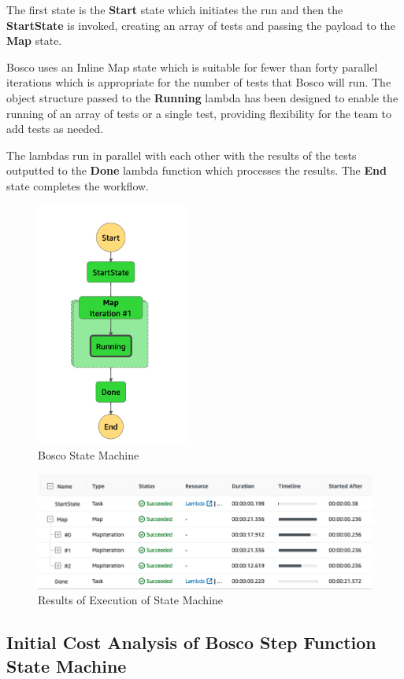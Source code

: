 \documentclass[12pt,a4paper,titlepage]{report}
\begin{document}
The first state is the \textbf{Start} state which initiates the run and then the \textbf{StartState} is invoked, creating an array of tests and passing the payload to the \textbf{Map} state.

Bosco uses an Inline Map state which is suitable for fewer than forty parallel iterations which is appropriate for the number of tests that Bosco will run. 
The object structure passed to the \textbf{Running} lambda has been designed to enable the running of an array of tests or a single test, providing flexibility for the team to add tests as needed.

The lambdas run in parallel with each other with the results of the tests outputted to the \textbf{Done} lambda function which processes the results. The \textbf{End} state completes the workflow.

\begin{figure}[H]
 \centering
 \includegraphics[width=5cm]{./diagrams/step_function}
 \caption{Bosco State Machine}
\end{figure}

\begin{figure}[H]
 \centering
 \includegraphics[width=15cm]{./diagrams/tablestepfx.png}
 \caption{Results of Execution of State Machine}
\end{figure}
\clearpage
\subsection{Initial Cost Analysis of Bosco Step Function State Machine}
\end{document}
